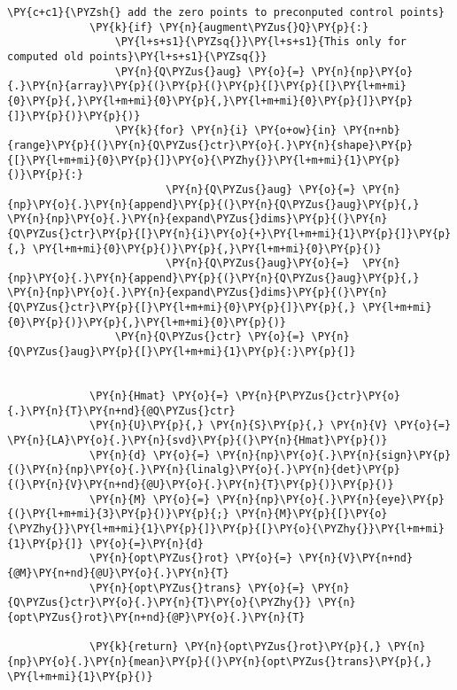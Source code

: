 \begin{Verbatim}[commandchars=\\\{\}]
             \PY{c+c1}{\PYZsh{} add the zero points to preconputed control points}
             \PY{k}{if} \PY{n}{augment\PYZus{}Q}\PY{p}{:}
                 \PY{l+s+s1}{\PYZsq{}}\PY{l+s+s1}{This only for computed old points}\PY{l+s+s1}{\PYZsq{}}
                 \PY{n}{Q\PYZus{}aug} \PY{o}{=} \PY{n}{np}\PY{o}{.}\PY{n}{array}\PY{p}{(}\PY{p}{(}\PY{p}{[}\PY{p}{[}\PY{l+m+mi}{0}\PY{p}{,}\PY{l+m+mi}{0}\PY{p}{,}\PY{l+m+mi}{0}\PY{p}{]}\PY{p}{]}\PY{p}{)}\PY{p}{)}
                 \PY{k}{for} \PY{n}{i} \PY{o+ow}{in} \PY{n+nb}{range}\PY{p}{(}\PY{n}{Q\PYZus{}ctr}\PY{o}{.}\PY{n}{shape}\PY{p}{[}\PY{l+m+mi}{0}\PY{p}{]}\PY{o}{\PYZhy{}}\PY{l+m+mi}{1}\PY{p}{)}\PY{p}{:}
                         \PY{n}{Q\PYZus{}aug} \PY{o}{=} \PY{n}{np}\PY{o}{.}\PY{n}{append}\PY{p}{(}\PY{n}{Q\PYZus{}aug}\PY{p}{,} \PY{n}{np}\PY{o}{.}\PY{n}{expand\PYZus{}dims}\PY{p}{(}\PY{n}{Q\PYZus{}ctr}\PY{p}{[}\PY{n}{i}\PY{o}{+}\PY{l+m+mi}{1}\PY{p}{]}\PY{p}{,} \PY{l+m+mi}{0}\PY{p}{)}\PY{p}{,}\PY{l+m+mi}{0}\PY{p}{)}
                         \PY{n}{Q\PYZus{}aug}\PY{o}{=}  \PY{n}{np}\PY{o}{.}\PY{n}{append}\PY{p}{(}\PY{n}{Q\PYZus{}aug}\PY{p}{,} \PY{n}{np}\PY{o}{.}\PY{n}{expand\PYZus{}dims}\PY{p}{(}\PY{n}{Q\PYZus{}ctr}\PY{p}{[}\PY{l+m+mi}{0}\PY{p}{]}\PY{p}{,} \PY{l+m+mi}{0}\PY{p}{)}\PY{p}{,}\PY{l+m+mi}{0}\PY{p}{)}
                 \PY{n}{Q\PYZus{}ctr} \PY{o}{=} \PY{n}{Q\PYZus{}aug}\PY{p}{[}\PY{l+m+mi}{1}\PY{p}{:}\PY{p}{]}
         
         
             \PY{n}{Hmat} \PY{o}{=} \PY{n}{P\PYZus{}ctr}\PY{o}{.}\PY{n}{T}\PY{n+nd}{@Q\PYZus{}ctr}
             \PY{n}{U}\PY{p}{,} \PY{n}{S}\PY{p}{,} \PY{n}{V} \PY{o}{=} \PY{n}{LA}\PY{o}{.}\PY{n}{svd}\PY{p}{(}\PY{n}{Hmat}\PY{p}{)}
             \PY{n}{d} \PY{o}{=} \PY{n}{np}\PY{o}{.}\PY{n}{sign}\PY{p}{(}\PY{n}{np}\PY{o}{.}\PY{n}{linalg}\PY{o}{.}\PY{n}{det}\PY{p}{(}\PY{n}{V}\PY{n+nd}{@U}\PY{o}{.}\PY{n}{T}\PY{p}{)}\PY{p}{)}
             \PY{n}{M} \PY{o}{=} \PY{n}{np}\PY{o}{.}\PY{n}{eye}\PY{p}{(}\PY{l+m+mi}{3}\PY{p}{)}\PY{p}{;} \PY{n}{M}\PY{p}{[}\PY{o}{\PYZhy{}}\PY{l+m+mi}{1}\PY{p}{]}\PY{p}{[}\PY{o}{\PYZhy{}}\PY{l+m+mi}{1}\PY{p}{]} \PY{o}{=}\PY{n}{d}
             \PY{n}{opt\PYZus{}rot} \PY{o}{=} \PY{n}{V}\PY{n+nd}{@M}\PY{n+nd}{@U}\PY{o}{.}\PY{n}{T}
             \PY{n}{opt\PYZus{}trans} \PY{o}{=} \PY{n}{Q\PYZus{}ctr}\PY{o}{.}\PY{n}{T}\PY{o}{\PYZhy{}} \PY{n}{opt\PYZus{}rot}\PY{n+nd}{@P}\PY{o}{.}\PY{n}{T}
         
             \PY{k}{return} \PY{n}{opt\PYZus{}rot}\PY{p}{,} \PY{n}{np}\PY{o}{.}\PY{n}{mean}\PY{p}{(}\PY{n}{opt\PYZus{}trans}\PY{p}{,} \PY{l+m+mi}{1}\PY{p}{)}
\end{Verbatim}


